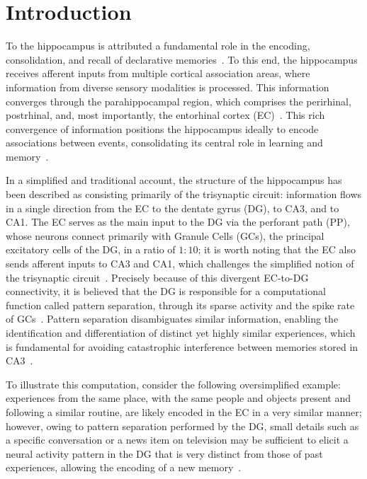 \chapter{Introduction}

To the hippocampus is attributed a fundamental role in the encoding, consolidation, and recall of declarative
memories~\parencite{eichenbaumHippocampus1999, liaoLearning2024}. To this end, the hippocampus receives afferent inputs from multiple
cortical association areas, where information from diverse sensory modalities is processed. This information converges through the
parahippocampal region, which comprises the perirhinal, postrhinal, and, most importantly, the entorhinal cortex
(EC)~\parencite{eichenbaumCortical2000}. This rich convergence of information positions the hippocampus ideally to encode associations
between events, consolidating its central role in learning and memory~\parencite{henkeModel2010, berdugo-vegaSharpening2023}.

In a simplified and traditional account, the structure of the hippocampus has been described as consisting primarily of the
trisynaptic circuit: information flows in a single direction from the EC to the dentate gyrus (DG), to CA3, and to CA1. The EC
serves as the main input to the DG via the perforant path (PP), whose neurons connect primarily with Granule Cells (GCs), the
principal excitatory cells of the DG, in a ratio of $1:10$; it is worth noting that the EC also sends afferent inputs to CA3 and
CA1, which challenges the simplified notion of the trisynaptic circuit~\parencite{basuCorticohippocampal2015}. Precisely because of
this divergent EC-to-DG connectivity, it is believed that the DG is responsible for a computational function called pattern
separation, through its sparse activity and the spike rate of GCs~\parencite{hainmuellerDentate2020, kesnerMnemonic2006,
yassaPattern2011}. Pattern separation disambiguates similar information, enabling the identification and differentiation of
distinct yet highly similar experiences, which is fundamental for avoiding catastrophic interference between memories stored in
CA3~\parencite{rollsMechanisms2013}.

To illustrate this computation, consider the following oversimplified example: experiences from the same place, with the same
people and objects present and following a similar routine, are likely encoded in the EC in a very similar manner; however, owing
to pattern separation performed by the DG, small details such as a specific conversation or a news item on television may be
sufficient to elicit a neural activity pattern in the DG that is very distinct from those of past experiences, allowing the
encoding of a new memory~\parencite{eichenbaumHippocampus2004}.

